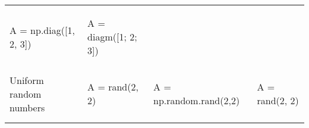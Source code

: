 \documentclass[10pt, landscape]{article}
\newenvironment{Shaded}{}{}
\newcommand{\DecValTok}[1]{\textcolor[rgb]{0.25,0.63,0.44}{{#1}}}
\newcommand{\FloatTok}[1]{\textcolor[rgb]{0.25,0.63,0.44}{{#1}}}
\newcommand{\OperatorTok}[1]{\textcolor[rgb]{0.40,0.40,0.40}{{#1}}}
\newcommand{\NormalTok}[1]{{#1}}
\begin{document}
\begin{multicols}{2}
\begin{tabular}[ ]{@{}llll@{}}
\begin{minipage}[t]{0.25\columnwidth}
\begin{Shaded}
\begin{Highlighting}[]
\NormalTok{A }\OperatorTok{=} \NormalTok{np.diag([}\DecValTok{1}\NormalTok{, }\DecValTok{2}\NormalTok{, }\DecValTok{3}\NormalTok{])}
\end{Highlighting}
\end{Shaded}
\strut
\end{minipage} & \begin{minipage}[t]{0.20\columnwidth}\raggedright\strut
\begin{Shaded}
\begin{Highlighting}[]
\NormalTok{A = diagm([}\FloatTok{1}\NormalTok{; }\FloatTok{2}\NormalTok{; }\FloatTok{3}\NormalTok{])}
\end{Highlighting}
\end{Shaded}
\strut
\end{minipage}\tabularnewline
\begin{minipage}[t]{0.24\columnwidth}\raggedright\strut
Uniform random numbers\strut
\end{minipage} & \begin{minipage}[t]{0.20\columnwidth}\raggedright\strut
\begin{Shaded}
\begin{Highlighting}[]
\NormalTok{A = rand(}\FloatTok{2}\NormalTok{, }\FloatTok{2}\NormalTok{)}
\end{Highlighting}
\end{Shaded}
\strut
\end{minipage} & \begin{minipage}[t]{0.25\columnwidth}\raggedright\strut
\begin{Shaded}
\begin{Highlighting}[]
\NormalTok{A }\OperatorTok{=} \NormalTok{np.random.rand(}\DecValTok{2}\NormalTok{,}\DecValTok{2}\NormalTok{)}
\end{Highlighting}
\end{Shaded}
\strut
\end{minipage} & \begin{minipage}[t]{0.20\columnwidth}\raggedright\strut
\begin{Shaded}
\begin{Highlighting}[]
\NormalTok{A = rand(}\FloatTok{2}\NormalTok{, }\FloatTok{2}\NormalTok{)}
\end{Highlighting}
\end{Shaded}
\strut
\end{minipage}\tabularnewline
\begin{minipage}[t]{0.24\columnwidth}\raggedright\strut

\end{minipage}
\end{tabular}
\end{multicols}
\end{document}
